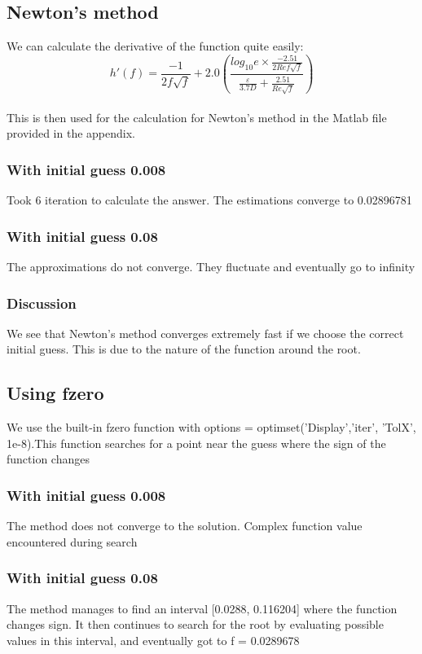 \documentclass[openany]{book}
\begin{document}
    \subsection{Newton's method}
    We can calculate the derivative of the function quite easily: \\
    \[ h'(f) = \frac{-1}{2 f \sqrt{f}} + 2.0 \left(\frac{log_{10} e \times \frac{-2.51}{2 \textit{Re} f \sqrt{f}}}{\frac{\varepsilon}{3.7D} + \frac{2.51}{\textit{Re}\sqrt{f}}}\right) \]\\
    This is then used for the calculation for Newton's method in the Matlab file provided in the appendix.
    \subsubsection{With initial guess 0.008}
    Took 6 iteration to calculate the answer. The estimations converge to 0.02896781 
    \subsubsection{With initial guess 0.08}
    The approximations do not converge. They fluctuate and eventually go to infinity
    \subsubsection{Discussion}
    We see that Newton's method converges extremely fast if we choose the correct initial guess. This is due to the nature of the function around the root.
    \subsection{Using fzero}
    We use the built-in fzero function with options = optimset('Display','iter', 'TolX', 1e-8).This function searches for a point near the guess where the sign of the function changes
    \subsubsection{With initial guess 0.008}
    The method does not converge to the solution. Complex function value encountered during search
    \subsubsection{With initial guess 0.08}
    The method manages to find an interval [0.0288, 0.116204] where the function changes sign. It then continues to search for the root by evaluating possible values in this interval, and eventually got to f = 0.0289678 
\end{document}

